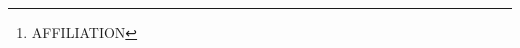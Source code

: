 \documentclass[a4paper,10.5pt,uplatex]{jsarticle}
\begin{document}
\title{}
\author{NAME\thanks{AFFILIATION}}
\date{20**/**/**}
\maketitle

%
\end{document}
